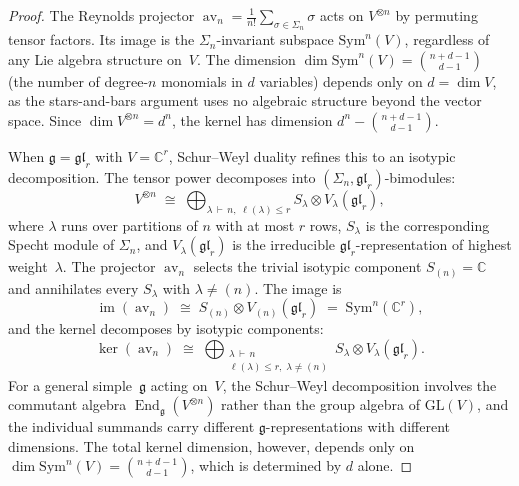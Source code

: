 \documentclass[11pt,reqno]{amsart}
\theoremstyle{definition}
\theoremstyle{remark}
\newcommand{\Sym}{\mathrm{Sym}}
\DeclareMathOperator{\End}{End}
\DeclareMathOperator{\av}{av}
\newcommand{\fg}{\mathfrak{g}}
\newcommand{\CC}{\mathbb{C}}
\numberwithin{equation}{section}
\begin{document}
\begin{proof}
The Reynolds projector
$\av_n = \frac{1}{n!}\sum_{\sigma \in \Sigma_n} \sigma$
acts on $V^{\otimes n}$ by permuting tensor factors.
Its image is the $\Sigma_n$-invariant subspace
$\Sym^n(V)$, regardless of any Lie algebra structure
on~$V$. The dimension
$\dim\Sym^n(V) = \binom{n+d-1}{d-1}$ (the number of
degree-$n$ monomials in $d$ variables) depends only on
$d = \dim V$, as the stars-and-bars argument uses no
algebraic structure beyond the vector space.
Since $\dim V^{\otimes n} = d^n$, the kernel has dimension
$d^n - \binom{n+d-1}{d-1}$.

When $\fg = \mathfrak{gl}_r$ with $V = \CC^r$,
Schur--Weyl duality refines this to an isotypic
decomposition. The tensor power decomposes into
$(\Sigma_n, \mathfrak{gl}_r)$-bimodules:
\begin{equation}\label{eq:schur-weyl-decomp}
  V^{\otimes n}
  \;\cong\;
  \bigoplus_{\lambda \,\vdash\, n,\;
    \ell(\lambda) \leq r}
  S_\lambda \otimes V_\lambda(\mathfrak{gl}_r),
\end{equation}
where $\lambda$ runs over partitions of $n$ with at most
$r$ rows, $S_\lambda$ is the corresponding Specht module
of $\Sigma_n$, and $V_\lambda(\mathfrak{gl}_r)$ is the
irreducible $\mathfrak{gl}_r$-representation of highest
weight~$\lambda$.
The projector $\av_n$ selects the trivial isotypic
component $S_{(n)} = \CC$ and annihilates every
$S_\lambda$ with $\lambda \neq (n)$. The image is
\[
  \operatorname{im}(\av_n)
  \;\cong\;
  S_{(n)} \otimes V_{(n)}(\mathfrak{gl}_r)
  \;=\;
  \Sym^n(\CC^r),
\]
and the kernel decomposes by isotypic components:
\[
  \ker(\av_n)
  \;\cong\;
  \bigoplus_{\substack{\lambda \,\vdash\, n \\
    \ell(\lambda) \leq r,\;
    \lambda \neq (n)}}
  S_\lambda \otimes V_\lambda(\mathfrak{gl}_r).
\]
For a general simple~$\fg$ acting on~$V$, the Schur--Weyl
decomposition involves the commutant algebra
$\End_\fg(V^{\otimes n})$ rather than the group algebra of
$\mathrm{GL}(V)$, and the individual summands carry different
$\fg$-representations with different dimensions.
The total kernel dimension, however, depends only on
$\dim\Sym^n(V) = \binom{n+d-1}{d-1}$, which is
determined by $d$ alone.
\end{proof}
\end{document}
